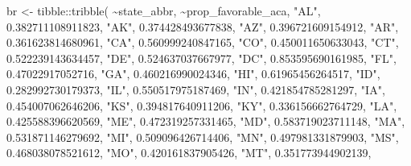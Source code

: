 \documentclass[
]{book}
\newenvironment{Shaded}{\begin{snugshade}}{\end{snugshade}}
\newcommand{\FloatTok}[1]{\textcolor[rgb]{0.00,0.00,0.81}{#1}}
\newcommand{\FunctionTok}[1]{\textcolor[rgb]{0.00,0.00,0.00}{#1}}
\newcommand{\NormalTok}[1]{#1}
\newcommand{\OtherTok}[1]{\textcolor[rgb]{0.56,0.35,0.01}{#1}}
\newcommand{\SpecialCharTok}[1]{\textcolor[rgb]{0.00,0.00,0.00}{#1}}
\newcommand{\StringTok}[1]{\textcolor[rgb]{0.31,0.60,0.02}{#1}}
\begin{document}
\begin{Shaded}
\begin{Highlighting}[]
\NormalTok{br }\OtherTok{\textless{}{-}}\NormalTok{ tibble}\SpecialCharTok{::}\FunctionTok{tribble}\NormalTok{(}
  \SpecialCharTok{\textasciitilde{}}\NormalTok{state\_abbr, }\SpecialCharTok{\textasciitilde{}}\NormalTok{prop\_favorable\_aca,}
         \StringTok{"AL"}\NormalTok{,   }\FloatTok{0.382711108911823}\NormalTok{,}
         \StringTok{"AK"}\NormalTok{,   }\FloatTok{0.374428493677838}\NormalTok{,}
         \StringTok{"AZ"}\NormalTok{,   }\FloatTok{0.396721609154912}\NormalTok{,}
         \StringTok{"AR"}\NormalTok{,   }\FloatTok{0.361623814680961}\NormalTok{,}
         \StringTok{"CA"}\NormalTok{,   }\FloatTok{0.560999240847165}\NormalTok{,}
         \StringTok{"CO"}\NormalTok{,   }\FloatTok{0.450011650633043}\NormalTok{,}
         \StringTok{"CT"}\NormalTok{,   }\FloatTok{0.522239143634457}\NormalTok{,}
         \StringTok{"DE"}\NormalTok{,   }\FloatTok{0.524637037667977}\NormalTok{,}
         \StringTok{"DC"}\NormalTok{,   }\FloatTok{0.853595690161985}\NormalTok{,}
         \StringTok{"FL"}\NormalTok{,    }\FloatTok{0.47022917052716}\NormalTok{,}
         \StringTok{"GA"}\NormalTok{,   }\FloatTok{0.460216990024346}\NormalTok{,}
         \StringTok{"HI"}\NormalTok{,    }\FloatTok{0.61965456264517}\NormalTok{,}
         \StringTok{"ID"}\NormalTok{,   }\FloatTok{0.282992730179373}\NormalTok{,}
         \StringTok{"IL"}\NormalTok{,   }\FloatTok{0.550517975187469}\NormalTok{,}
         \StringTok{"IN"}\NormalTok{,   }\FloatTok{0.421854785281297}\NormalTok{,}
         \StringTok{"IA"}\NormalTok{,   }\FloatTok{0.454007062646206}\NormalTok{,}
         \StringTok{"KS"}\NormalTok{,   }\FloatTok{0.394817640911206}\NormalTok{,}
         \StringTok{"KY"}\NormalTok{,   }\FloatTok{0.336156662764729}\NormalTok{,}
         \StringTok{"LA"}\NormalTok{,   }\FloatTok{0.425588396620569}\NormalTok{,}
         \StringTok{"ME"}\NormalTok{,   }\FloatTok{0.472319257331465}\NormalTok{,}
         \StringTok{"MD"}\NormalTok{,   }\FloatTok{0.583719023711148}\NormalTok{,}
         \StringTok{"MA"}\NormalTok{,   }\FloatTok{0.531871146279692}\NormalTok{,}
         \StringTok{"MI"}\NormalTok{,   }\FloatTok{0.509096426714406}\NormalTok{,}
         \StringTok{"MN"}\NormalTok{,   }\FloatTok{0.497981331879903}\NormalTok{,}
         \StringTok{"MS"}\NormalTok{,   }\FloatTok{0.468038078521612}\NormalTok{,}
         \StringTok{"MO"}\NormalTok{,   }\FloatTok{0.420161837905426}\NormalTok{,}
         \StringTok{"MT"}\NormalTok{,   }\FloatTok{0.351773944902139}\NormalTok{,}

\end{Highlighting}
\end{Shaded}
\end{document}
